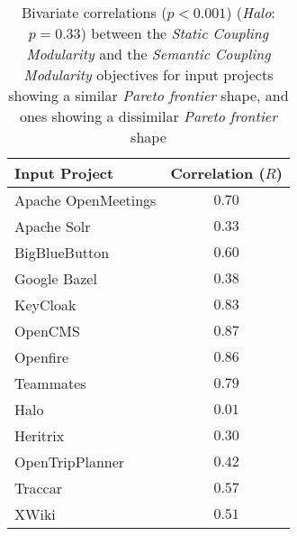 \documentclass[12pt,a4paper]{report}
\begin{document}
\begin{table}[h!]
\def\arraystretch{1.55}
\begin{tabularx}{\textwidth}{|X|c|}
\hline
Input Project & Correlation ($R$) \\
\hline\hline

Apache OpenMeetings & $0.70$  \\\hline
Apache Solr         & $0.33$  \\\hline
BigBlueButton       & $0.60$  \\\hline
Google Bazel        & $0.38$  \\\hline
KeyCloak            & $0.83$  \\\hline
OpenCMS             & $0.87$  \\\hline
Openfire            & $0.86$  \\\hline
Teammates           & $0.79$  \\\hline
\hline\hline
Halo                & $0.01$  \\\hline
Heritrix            & $0.30$  \\\hline
OpenTripPlanner     & $0.42$  \\\hline
Traccar             & $0.57$  \\\hline
XWiki               & $0.51$  \\\hline

\end{tabularx}
\caption{Bivariate correlations ($p < 0.001$) (\textit{Halo}: $p = 0.33$) between the \textit{Static Coupling Modularity} and the \textit{Semantic Coupling Modularity} objectives for input projects showing a similar \textit{Pareto frontier} shape, and ones showing a dissimilar \textit{Pareto frontier} shape}
\label{table:experiment-4.1}
\end{table}
\end{document}
